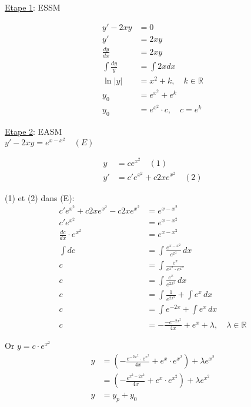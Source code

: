 \underline{Etape 1}: ESSM

\begin{align*}
	y' - 2xy &= 0 \\
	y' &= 2xy \\
	\frac{dy}{dx} &= 2xy \\
	\int \frac{dy}{y} &= \int 2xdx \\
	\ln|y| &= x^2 + k, \quad k \in \mathbb{R} \\
	y_0 &= e^{x^2} + e^k \\
	y_0 &= e^{x^2} \cdot c, \quad c = e^k
\end{align*}

\underline{Etape 2}: EASM \\
$y' - 2xy = e^{x-x^2} \quad (E) $ \\

\begin{align*}
	y &= ce^{x^2} \quad (1) \\
	y' &= c'e^{x^2} + c2xe^{x^2} \quad (2)
\end{align*}

(1) et (2) dans (E): \\
\begin{align*}
	c'e^{x^2} + c2xe^{x^2} - c2xe^{x^2} &= e^{x - x^2} \\
	c'e^{x^2} &= e^{x-x^2} \\
	\frac{dc}{dx} \cdot e^{x^2} &= e^{x - x^2} \\
	\int dc &= \int \frac{e^{x - x^2}}{e^{x^2}} \, dx \\
	c &= \int \frac{e^x}{e^{x^2} \cdot e^{x^2}} \\
	c &= \int \frac{e^x}{e^{2x^2}} \, dx \\
	c &= \int \frac{1}{e^{2x^2}} + \int e^x \, dx \\
	c &= \int e^{-2x} + \int e^x \, dx \\
	c &= - \frac{-e^{-2x^2}}{4x} + e^x + \lambda, \quad \lambda \in \mathbb{R}
\end{align*}

Or $y = c \cdot e^{x^2}$ \\
\begin{align*}
	y &= ( - \frac{e^{-2x^2} \cdot e^{x^2}}{4x} + e^x \cdot e^{x^2} )  + \lambda e^{x^2} \\
	&= ( - \frac{e^{x^2 - 2x^2}}{4x} + e^x \cdot e^{x^2} )  + \lambda e^{x^2} \\
	y &= y_p + y_0
\end{align*}

